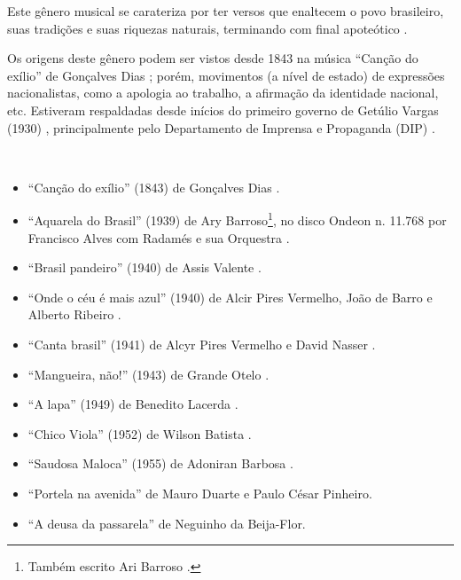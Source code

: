 Este gênero musical se carateriza por ter versos que enaltecem o povo brasileiro, 
suas tradições e suas riquezas naturais, terminando com final apoteótico  \cite[pp. 73]{diniz2006almanaque}.

Os origens deste gênero podem ser vistos desde 1843 na música ``Canção do exílio'' de Gonçalves Dias \cite[pp. 128]{perna2002samba};
porém, movimentos (a nível de estado) de expressões nacionalistas, como a apologia ao trabalho,
a afirmação da identidade nacional, etc.
Estiveram respaldadas desde inícios do primeiro governo de Getúlio Vargas (1930) \cite[pp. 67]{haussen2001radio},
principalmente pelo Departamento de Imprensa e Propaganda (DIP) \cite[pp. 74]{fenerick2005nem}.
\begin{example} ~

\begin{itemize}
\item ``Canção do exílio'' (1843) de Gonçalves Dias \cite[pp. 128]{perna2002samba}.
\item ``Aquarela do Brasil'' (1939) de Ary Barroso\footnote{Também escrito Ari Barroso  \cite[pp. 685]{marcondes1977enciclopediav2}.},
no disco Ondeon n. 11.768 por Francisco Alves com Radamés e sua Orquestra  \cite[pp. 685]{marcondes1977enciclopediav2} \cite[pp. 73]{diniz2006almanaque} \cite[pp. 128]{perna2002samba}.

\item ``Brasil pandeiro'' (1940) de Assis Valente \cite{subgenerosdosamba2} \cite[pp. 920]{marcondes1977enciclopediav2}.
\item ``Onde o céu é mais azul'' (1940) de Alcir Pires Vermelho, João de Barro e Alberto Ribeiro \cite[pp. 67]{haussen2001radio} \cite[pp. 1060]{marcondes1977enciclopediav2}.
\item ``Canta brasil'' (1941) de Alcyr Pires Vermelho e David Nasser \cite[pp. 53]{chediak2004101} \cite[pp. 929]{marcondes1977enciclopediav2}.
\item ``Mangueira, não!'' (1943) de Grande Otelo \cite{subgenerosdosamba2}.
\item ``A lapa'' (1949) de Benedito Lacerda \cite{subgenerosdosamba2}.
\item ``Chico Viola'' (1952) de Wilson Batista \cite{subgenerosdosamba2}.
\item ``Saudosa Maloca'' (1955) de Adoniran Barbosa \cite{subgenerosdosamba2}.

\item ``Portela na avenida''  de Mauro Duarte e Paulo César Pinheiro.
\item ``A deusa da passarela'' de Neguinho da Beija-Flor.

\end{itemize}
\end{example}

